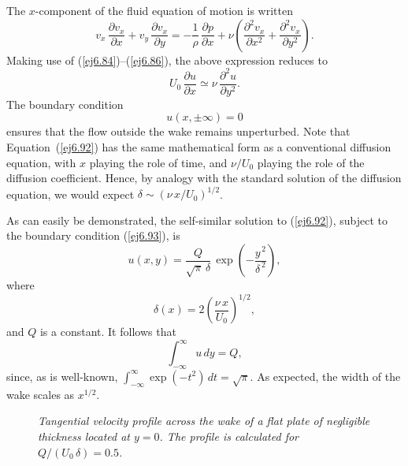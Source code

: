 The $x$-component of the fluid equation of motion  is written
\begin{equation}
v_x\,\frac{\partial v_x}{\partial x} + v_y\,\frac{\partial v_x}{\partial y} = -\frac{1}{\rho}\,\frac{\partial p}{\partial x} + 
\nu\left(\frac{\partial^2 v_x}{\partial x^2} + \frac{\partial^2 v_x}{\partial y^2}\right).
\end{equation}
Making use of (\ref{ej6.84})--(\ref{ej6.86}), the above expression reduces to 
\begin{equation}\label{ej6.92}
U_0\,\frac{\partial u}{\partial x} \simeq \nu\,\frac{\partial^2 u}{\partial y^2}.
\end{equation}
The boundary condition 
\begin{equation}\label{ej6.93}
u(x,\pm\infty) = 0
\end{equation}
ensures that the flow outside the wake remains unperturbed. 
Note that Equation~(\ref{ej6.92}) has the same mathematical form as a conventional diffusion equation, with $x$ playing the role of time, and 
$\nu/U_0$ playing the role of the diffusion coefficient. Hence, by analogy with the standard solution
of the diffusion equation, we would expect $\delta\sim (\nu\,x/U_0)^{1/2}$. 

As can easily be demonstrated, the self-similar solution to (\ref{ej6.92}), subject to the boundary condition (\ref{ej6.93}),
is
\begin{equation}
u(x,y) = \frac{Q}{\sqrt{\pi}\,\delta}\,\exp\left(-\frac{y^{\,2}}{\delta^{\,2}}\right),
\end{equation}
where
\begin{equation}
\delta(x)  =2\left(\frac{\nu\,x}{U_0}\right)^{1/2},
\end{equation}
and $Q$ is a constant. 
It follows that
\begin{equation}\label{ej6.99}
\int_{-\infty}^\infty u\,dy = Q,
\end{equation}
since, as is well-known, $\int_{-\infty}^\infty \exp(-t^2)\,dt = \sqrt{\pi}$. As expected, the width of the wake scales as $x^{1/2}$. 

\begin{figure}
\epsfysize=3.25in
\centerline{}
\caption{\em Tangential velocity profile across the wake of a flat plate of negligible
thickness located at $y=0$. The profile is calculated for $Q/(U_0\,\delta)=0.5$.}\label{fvx1}
\end{figure}

